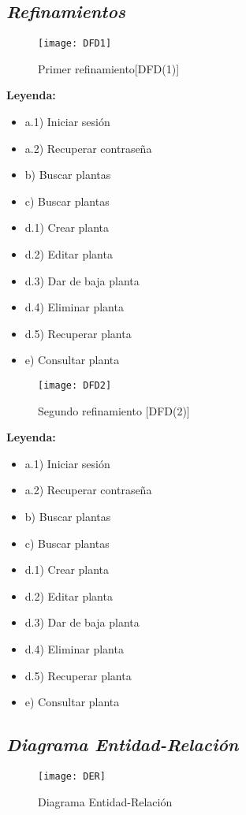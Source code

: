 \documentclass[10pt,a4paper]{article}
\begin{document}
\subsection{\textbf{\textit{Refinamientos}}}
\begin{wrapfigure}[11]{l}{10cm}
\texttt{[image: DFD1]}
\caption{Primer refinamiento[DFD(1)]}
\end{wrapfigure}


\textbf{Leyenda:}

	\begin{itemize}[label=]
		\item a.1) Iniciar sesión
		\item a.2) Recuperar contraseña \\
		\item b) Buscar plantas \\
		\item c) Buscar plantas \\
		\item d.1) Crear planta
		\item d.2) Editar planta
		\item d.3) Dar de baja planta
		\item d.4) Eliminar planta
		\item d.5) Recuperar planta\\
		\item e) Consultar planta
	\end{itemize}
	
\vspace{3cm}

\begin{wrapfigure}[11]{l}{10cm}
\texttt{[image: DFD2]}
\caption{Segundo refinamiento [DFD(2)]}
\end{wrapfigure}


\textbf{Leyenda:}

	\begin{itemize}[label=]
		\item a.1) Iniciar sesión
		\item a.2) Recuperar contraseña 
		\item b) Buscar plantas 
		\item c) Buscar plantas 
		\item d.1) Crear planta
		\item d.2) Editar planta
		\item d.3) Dar de baja planta
		\item d.4) Eliminar planta
		\item d.5) Recuperar planta
		\item e) Consultar planta
	\end{itemize}

\newpage
\subsection{\textbf{\textit{Diagrama Entidad-Relación}}}


\begin{figure} [h!]
\centering \texttt{[image: DER]}
\caption{Diagrama Entidad-Relación}
\end{figure}
\end{document}
